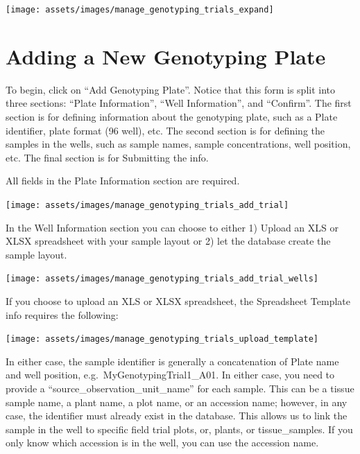 \documentclass[
  12pt,
]{book}
\begin{document}
\begin{center}\texttt{[image: assets/images/manage\_genotyping\_trials\_expand]} \end{center}

\hypertarget{adding-a-new-genotyping-plate}{%
\section{Adding a New Genotyping Plate}\label{adding-a-new-genotyping-plate}}

To begin, click on ``Add Genotyping Plate''. Notice that this form is split into three sections: ``Plate Information'', ``Well Information'', and ``Confirm''. The first section is for defining information about the genotyping plate, such as a Plate identifier, plate format (96 well), etc. The second section is for defining the samples in the wells, such as sample names, sample concentrations, well position, etc. The final section is for Submitting the info.

All fields in the Plate Information section are required.

\begin{center}\texttt{[image: assets/images/manage\_genotyping\_trials\_add\_trial]} \end{center}

In the Well Information section you can choose to either 1) Upload an XLS or XLSX spreadsheet with your sample layout or 2) let the database create the sample layout.

\begin{center}\texttt{[image: assets/images/manage\_genotyping\_trials\_add\_trial\_wells]} \end{center}

If you choose to upload an XLS or XLSX spreadsheet, the Spreadsheet Template info requires the following:

\begin{center}\texttt{[image: assets/images/manage\_genotyping\_trials\_upload\_template]} \end{center}

In either case, the sample identifier is generally a concatenation of Plate name and well position, e.g.~MyGenotypingTrial1\_A01. In either case, you need to provide a ``source\_observation\_unit\_name'' for each sample. This can be a tissue sample name, a plant name, a plot name, or an accession name; however, in any case, the identifier must already exist in the database. This allows us to link the sample in the well to specific field trial plots, or, plants, or tissue\_samples. If you only know which accession is in the well, you can use the accession name.
\end{document}
